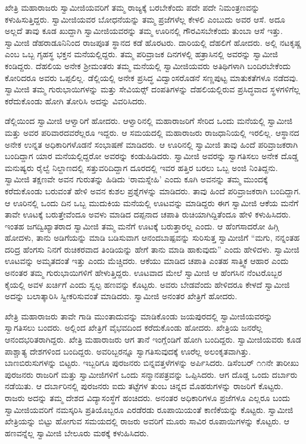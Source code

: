  ಖೇತ್ರಿ ಮಹಾರಾಜರು ಸ್ವಾಮೀಜಿಯವರಿಗೆ ತಮ್ಮ ರಾಜ್ಯಕ್ಕೆ ಬರಬೇಕೆಂದು ಪದೇ ಪದೇ ನಿಮಂತ್ರಣವನ್ನು ಕಳುಹಿಸುತ್ತಿದ್ದರು. ಸ್ವಾಮೀಜಿಯವರ ಬೋಧನೆಯನ್ನು ತಮ್ಮ ಪ್ರಜೆಗಳೆಲ್ಲ ಕೇಳಲಿ ಎಂಬುದು ಅವರ ಆಸೆ. ಅದೂ ಅಲ್ಲದೆ ತಾವು ಕೂಡ ಖುದ್ದಾಗಿ ಸ್ವಾಮೀಜಿಯವರನ್ನು ತಮ್ಮ ಊರಿನಲ್ಲಿ ಗೌರವಿಸಬೇಕೆಂದು ತುಂಬಾ ಆಸೆ ಇತ್ತು. ಸ್ವಾಮೀಜಿ ಡೆಹರಾಡೂನಿನಿಂದ ರಾಜಪೂತ ಸ್ಥಾನದ ಕಡೆ ಹೊರಟರು. ದಾರಿಯಲ್ಲಿ ದೆಹಲಿಗೆ ಹೋದರು. ಅಲ್ಲಿ ನಟಕೃಷ್ಣ ಎಂಬ ಒಬ್ಬ ಗೃಹಸ್ಥ ಭಕ್ತನ ಮನೆಯಲ್ಲಿದ್ದರು. ತಮ್ಮ ಪರಿವ್ರಾಜಕ ದಿನಗಳಲ್ಲಿ ಹತ್ರಾಸಿನಲ್ಲಿ ಅವರನ್ನು ಸ್ವಾಮೀಜಿ ಕಂಡಿದ್ದರು. ದೆಹಲಿಯ ಅನೇಕ ಶ‍್ರೀಮಂತರು ತಮ್ಮ ಮನೆಯಲ್ಲಿ ಸ್ವಾಮೀಜಿಯವರು ಅತಿಥಿಗಳಾಗಿ ಬಂದಿರಬೇಕೆಂದು ಕೋರಿದರೂ ಅವರು ಒಪ್ಪಲಿಲ್ಲ. ಡೆಲ್ಲಿಯಲ್ಲಿ ಅನೇಕ ಪ್ರಸಿದ್ಧ ವಿದ್ವಾಂಸರೊಡನೆ ಸಣ್ಣಪುಟ್ಟ ಮಾತುಕತೆಗಳೂ ನಡೆದವು. ಸ್ವಾಮೀಜಿ ತಮ್ಮ ಗುರುಭಾಯಿಗಳನ್ನು ಮತ್ತು ಸೇವಿಯರ್ಸ್‍‍ ದಂಪತಿಗಳನ್ನು ದೆಹಲಿಯಲ್ಲಿರುವ ಪ್ರಸಿದ್ಧವಾದ ಸ್ಥಳಗಳಿಗೆಲ್ಲ ಕರೆದುಕೊಂಡು ಹೋಗಿ ತೋರಿಸಿ ಅದನ್ನು ವಿವರಿಸಿದರು. 

 ಡೆಲ್ಲಿಯಿಂದ ಸ್ವಾಮೀಜಿ ಆಳ್ವಾರಿಗೆ ಹೋದರು. ಆಳ್ವಾರಿನಲ್ಲಿ ಮಹಾರಾಜರಿಗೆ ಸೇರಿದ ಒಂದು ಮನೆಯಲ್ಲಿ ಸ್ವಾಮೀಜಿ ಮತ್ತು ಅವರ ಪರಿವಾರದವರೆಲ್ಲರೂ ಇದ್ದರು. ಆ ಸಮಯದಲ್ಲಿ ಮಹಾರಾಜರು ರಾಜಧಾನಿಯಲ್ಲಿ ಇರಲಿಲ್ಲ. ಆಸ್ಥಾನದ ಅನೇಕ ಉನ್ನತ ಅಧಿಕಾರಿಗಳೊಡನೆ ಸಂಭಾಷಣೆ ಮಾಡಿದರು. ಆ ಊರಿನಲ್ಲಿ ಸ್ವಾಮೀಜಿ ತಾವು ಹಿಂದೆ ಪರಿವ್ರಾಜಕರಾಗಿ ಬಂದಿದ್ದಾಗ ಯಾರ ಮನೆಯಲ್ಲಿದ್ದರೋ ಅವರನ್ನು ಕಂಡುಹಿಡಿದರು. ಸ್ವಾಮೀಜಿ ಅವರನ್ನು ಸ್ವಾಗತಿಸಲು ಅನೇಕ ದೊಡ್ಡ ಮನುಷ್ಯರು ರೈಲ್ವೆ ನಿಲ್ದಾಣದಲ್ಲಿ ಸತ್ತುವರಿದಿದ್ದಾಗ ದೂರದಲ್ಲಿ ಇವರ ಹತ್ತಿರ ಬರಲು ಒಬ್ಬ ಅಂಜಿ ನಿಂತಿದ್ದನು. ಸ್ವಾಮೀಜಿ ತಕ್ಷಣವೇ ಅವನ ಗುರುತನ್ನು ಹಿಡಿದು ‘ರಾಮಸ್ನೇಹಿ’ ಎಂದು ಕೂಗಿ ಅವನನ್ನು ತಮ್ಮ ಮುಂದಕ್ಕೆ ಕರೆದುಕೊಂಡು ಬರುವಂತೆ ಹೇಳಿ ಅವನ ಕುಶಲ ಪ್ರಶ್ನೆಗಳನ್ನು ಮಾಡಿದರು. ತಾವು ಹಿಂದೆ ಪರಿವ್ರಾಜಕರಾಗಿ ಬಂದಿದ್ದಾಗ. ಆ ಊರಿನಲ್ಲಿ ಒಂದು ದಿನ ಒಬ್ಬ ಮುದುಕಿಯ ಮನೆಯಲ್ಲಿ ಊಟವನ್ನು ಮಾಡಿದ್ದರು ಈಗ ಸ್ವಾಮೀಜಿ ಆಕೆಯ ಮನೆಗೆ ತಾವೇ ಊಟಕ್ಕೆ ಬರುತ್ತೇವೆಂದೂ ಅವಳು ಮಾಡಿದ ದಪ್ಪನಾದ ಚಪಾತಿ ರುಚಿಯಾಗಿದ್ದಿತೆಂದೂ ಹೇಳಿ ಕಳುಹಿಸಿದರು. ಇಂತಹ ಜಗದ್ವಿಖ್ಯಾತರಾದ ಸ್ವಾಮೀಜಿ ತಮ್ಮ ಮನೆಗೆ ಊಟಕ್ಕೆ ಬರುತ್ತಾರಲ್ಲ ಎಂದು. ಆ ಹೆಂಗಸಾದರೋ ಹಿಗ್ಗಿ ಹೋದಳು, ತಾನು ಅಡಿಗೆಯನ್ನು ಮಾಡಿ ಬಡಿಸುವಾಗ ಆನಂದಬಾಷ್ಪವನ್ನು ಸುರಿಸುತ್ತ ಸ್ವಾಮೀಜಿಗೆ “ಮಗು, ನನ್ನಂತಹ ದರಿದ್ರ ಹೆಂಗಸು ನಿನಗೆ ರುಚಿಕರವಾದ ತಿಂಡಿಯನ್ನು ಹೇಗೆ ತಾನು ಮಾಡಿ ಹಾಕುವುದು” ಎಂದು ಹೇಳಿದಳು. ಸ್ವಾಮೀಜಿ ಊಟವನ್ನು ಅಮೃತದಂತೆ ಇತ್ತು ಎಂದು ಮೆಚ್ಚಿದರು. ಆಕೆಯು ಮಾಡಿದ ಚಪಾತಿ ಎಂತಹ ಸಾತ್ತ್ವಿಕ ಆಹಾರ ಎಂದು ಅನಂತರ ತಮ್ಮ ಗುರುಭಾಯಿಗಳಿಗೆ ಹೇಳುತ್ತಿದ್ದರು. ಊಟವಾದ ಮೇಲೆ ಸ್ವಾಮೀಜಿ ಆ ಹೆಂಗಸಿನ ನೆಂಟರೊಬ್ಬರ ಕೈಯಲ್ಲಿ ಅವಳ ಖರ್ಚಿಗೆ ಎಂದು ಸ್ವಲ್ಪ ಹಣವನ್ನು ಕೊಟ್ಟರು. ಅವರು ಬೇಡವೆಂದು ಹೇಳಿದರೂ ಕೇಳದೆ ಸ್ವಾಮೀಜಿ ಅದನ್ನು ಬಲಾತ್ಕಾರಿಸಿ ಸ್ವೀಕರಿಸುವಂತೆ ಮಾಡಿದರು. ಸ್ವಾಮೀಜಿ ಅನಂತರ ಖೇತ್ರಿಗೆ ಹೋದರು. 

 ಖೇತ್ರಿ ಮಹಾರಾಜರು ತಾವೇ ಗಾಡಿ ಮುಂತಾದುವನ್ನು ಮಾಡಿಕೊಂಡು ಜಯಪುರದಲ್ಲಿ ಸ್ವಾಮೀಜಿಯವರನ್ನು ಸ್ವಾಗತಿಸಲು ಬಂದರು. ಅಲ್ಲಿಂದ ಖೇತ್ರಿಗೆ ವೈಭವದಿಂದ ಕರೆದುಕೊಂಡು ಹೋದರು. ಖೇತ್ರಿಯ ಜನರೆಲ್ಲ ಆನಂದಭರಿತರಾಗಿದ್ದರು. ಖೇತ್ರಿ ಮಹಾರಾಜರು ಆಗ ತಾನೆ ಇಂಗ್ಲೆಂಡಿಗೆ ಹೋಗಿ ಬಂದಿದ್ದರು. ಸ್ವಾಮೀಜಿಯವರು ಕೂಡ ಪಾಶ್ಚಾತ್ಯ ದೇಶಗಳಿಂದ ಬಂದಿದ್ದರು. ಅವರಿಬ್ಬರನ್ನೂ ಸ್ವಾಗತಿಸುವುದಕ್ಕೆ ಊರೆಲ್ಲ ಅಲಂಕೃತವಾಗಿತ್ತು. ಬಾಣಬಿರುಸುಗಳನ್ನು ಬಿಟ್ಟರು. ಇಬ್ಬರಿಗೂ ಪುರಜನರು ಬಿನ್ನವತ್ತಳೆಗಳನ್ನು ಅರ್ಪಿಸಿದರು. ಡಿಸೆಂಬರ್ ೧೧ನೇ ತಾರೀಖು ಪುರಜನರು ರಾಜರಿಗೆ ಮತ್ತು ಸ್ವಾಮೀಜಿಗಳಿಗೆ ಒಂದು ಸನ್ಮಾನಪತ್ರವನ್ನು ಒಪ್ಪಿಸಿದರು. ಆಗ ದೊಡ್ಡ ಒಂದು ದರ್ಬಾರು ನಡೆಯಿತು. ಆ ದರ್ಬಾರಿನಲ್ಲಿ ಪುರಜನರು ಐದು ತಟ್ಟೆಗಳ ತುಂಬ ಚಿನ್ನದ ಮೊಹರುಗಳನ್ನು ರಾಜರಿಗೆ ಕೊಟ್ಟರು. ರಾಜರು ಅದನ್ನು ತಮ್ಮ ದೇಶದ ವಿದ್ಯಾಸಂಸ್ಥೆಗೆ\break
 ಹಂಚಿದರು. ಅನಂತರ ಅಧಿಕಾರಿಗಳೂ ಪ್ರಜೆಗಳೂ ಎಲ್ಲರೂ ಬಂದು ಸ್ವಾಮೀಜಿಯವರಿಗೆ ನಮಸ್ಕರಿಸಿ ಪ್ರತಿಯೊಬ್ಬರೂ ಎರಡೆರಡು ರೂಪಾಯಿಯಂತೆ ಕಾಣಿಕೆಯನ್ನು ಕೊಟ್ಟರು. ಸ್ವಾಮೀಜಿ ಖೇತ್ರಿಯನ್ನು ಬಿಟ್ಟು ಹೋಗುವ ಸಮಯದಲ್ಲಿ ರಾಜರು ಅವರಿಗೆ ಮೂರು ಸಾವಿರ ರೂಪಾಯಿಗಳನ್ನು ಕೊಟ್ಟರು. ಆ ಹಣವನ್ನೆಲ್ಲ ಸ್ವಾಮೀಜಿ ಬೇಲೂರು ಮಠಕ್ಕೆ ಕಳುಹಿಸಿದರು. 

